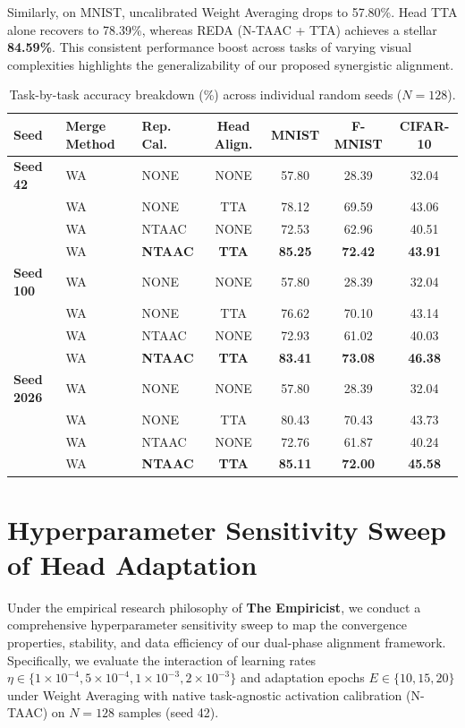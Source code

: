\documentclass{article}
\theoremstyle{plain}
\theoremstyle{definition}
\theoremstyle{remark}
\begin{document}
Similarly, on MNIST, uncalibrated Weight Averaging drops to 57.80\%. Head TTA alone recovers to 78.39\%, whereas REDA (N-TAAC + TTA) achieves a stellar \textbf{84.59\%}. This consistent performance boost across tasks of varying visual complexities highlights the generalizability of our proposed synergistic alignment.

\begin{table}[h]
  \caption{Task-by-task accuracy breakdown (\%) across individual random seeds ($N=128$).}
  \label{tab:seed_breakdown}
  \centering
  \small
  \begin{tabular}{lllcccc}
    \toprule
    Seed & Merge Method & Rep. Cal. & Head Align. & MNIST & F-MNIST & CIFAR-10 \\
    \midrule
    \textbf{Seed 42} 
    & WA & NONE & NONE & 57.80 & 28.39 & 32.04 \\
    & WA & NONE & TTA  & 78.12 & 69.59 & 43.06 \\
    & WA & NTAAC & NONE & 72.53 & 62.96 & 40.51 \\
    & WA & \textbf{NTAAC} & \textbf{TTA}  & \textbf{85.25} & \textbf{72.42} & \textbf{43.91} \\
    \midrule
    \textbf{Seed 100} 
    & WA & NONE & NONE & 57.80 & 28.39 & 32.04 \\
    & WA & NONE & TTA  & 76.62 & 70.10 & 43.14 \\
    & WA & NTAAC & NONE & 72.93 & 61.02 & 40.03 \\
    & WA & \textbf{NTAAC} & \textbf{TTA}  & \textbf{83.41} & \textbf{73.08} & \textbf{46.38} \\
    \midrule
    \textbf{Seed 2026} 
    & WA & NONE & NONE & 57.80 & 28.39 & 32.04 \\
    & WA & NONE & TTA  & 80.43 & 70.43 & 43.73 \\
    & WA & NTAAC & NONE & 72.76 & 61.87 & 40.24 \\
    & WA & \textbf{NTAAC} & \textbf{TTA}  & \textbf{85.11} & \textbf{72.00} & \textbf{45.58} \\
    \bottomrule
  \end{tabular}
\end{table}

\section{Hyperparameter Sensitivity Sweep of Head Adaptation}
\label{app:hparam_sweep}

Under the empirical research philosophy of \textbf{The Empiricist}, we conduct a comprehensive hyperparameter sensitivity sweep to map the convergence properties, stability, and data efficiency of our dual-phase alignment framework. Specifically, we evaluate the interaction of learning rates $\eta \in \{1 \times 10^{-4}, 5 \times 10^{-4}, 1 \times 10^{-3}, 2 \times 10^{-3}\}$ and adaptation epochs $E \in \{10, 15, 20\}$ under Weight Averaging with native task-agnostic activation calibration (N-TAAC) on $N=128$ samples (seed 42).
\end{document}
